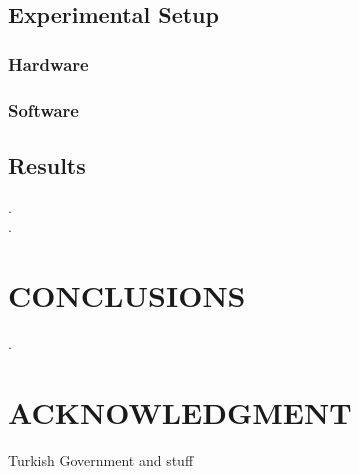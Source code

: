 \documentclass[letterpaper, 10 pt, conference]{ieeeconf}  %
\newcommand{\lorem}{
.
}
\begin{document}
  \subsection{Experimental Setup}
    \subsubsection{Hardware}
    \subsubsection{Software}
  \subsection{Results}
  \lorem{} \\
  \lorem{}

\section{\label{sec-CO}CONCLUSIONS}
  \lorem{}

\addtolength{\textheight}{-12cm}   %


\section*{ACKNOWLEDGMENT}
Turkish Government and stuff



\end{document}
